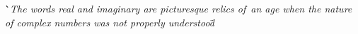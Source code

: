 \documentclass[preview]{standalone}
\begin{document}
\begin{center}
\``\textit{The words real and imaginary are picturesque relics of\
        an age when the nature of complex numbers was not properly understood}\"
\end{center}
\end{document}
